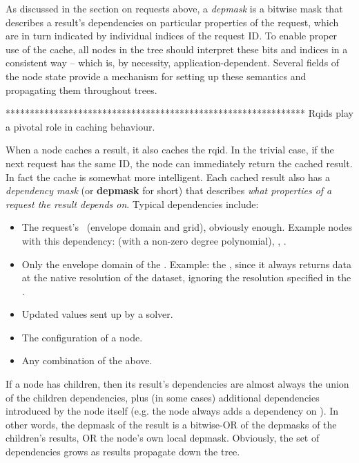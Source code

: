   As discussed in the section on requests above, a {\em depmask} is a bitwise
  mask that describes a result's dependencies on particular properties of the
  request, which are in turn indicated by individual indices of the request ID.
  To enable proper use of the cache, all nodes in the tree should interpret
  these bits and indices in a consistent way -- which is, by necessity,
  application-dependent. Several fields of the node state provide a mechanism
  for setting up these semantics and propagating them throughout trees. 

**************************************************************    
  Rqids play a pivotal role in caching behaviour. 
  
  When a node caches a result,
  it also caches the rqid. In the trivial case, if the next request has the
  same ID, the node can immediately return the cached result. In fact the cache
  is somewhat more intelligent. Each cached result also has a {\em dependency
  mask} (or {\bf depmask} for short) that describes {\em what properties of a
  request the result depends on}. Typical dependencies include:

  \begin{itemize} 
  
  \item The request's \Cells\ (envelope domain and grid), obviously enough.
  Example nodes with this dependency:  (with a non-zero degree
  polynomial), , . 

  \item Only the envelope domain of the \Cells. Example: the , since
  it always returns data at the native resolution of the dataset, ignoring the
  resolution specified in the \Cells.

  \item Updated  values sent up by a solver.
  
  \item The configuration of a  node.

  \item Any combination of the above. 

  \end{itemize}
  
  If a node has children, then its result's dependencies are almost always the
  union of the children dependencies, plus (in some cases) additional
  dependencies introduced by the node itself (e.g. the  node always
  adds a dependency on \Cells). In other words, the depmask of the result is 
  a bitwise-OR of the depmasks of the children's results, OR the node's own
  local depmask. Obviously, the set of dependencies grows as results propagate
  down the tree.

